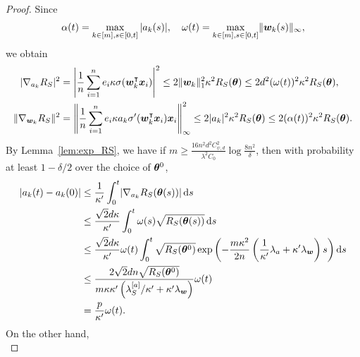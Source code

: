 \documentclass{article}
\begin{document}
\begin{proof}
    Since
    \begin{equation*}
        \alpha(t)=\max\limits_{k\in[m],s\in[0,t]}|a_k(s)|, \quad \omega(t)=\max\limits_{k\in[m],s\in[0,t]}\lVert\bm{w}_k(s)\rVert_{\infty},
    \end{equation*}
    we obtain
    \begin{equation*}
        \begin{aligned}
            \lvert\nabla_{a_k}R_S\rvert^2    & =\left\lvert\frac{1}{n}\sum_{i=1}^n e_i\kappa\sigma(\bm{w}_k^\intercal\bm{x}_i)\right\rvert^2\leq 2\lVert\bm{w}_k\rVert^2_1\kappa^2R_S(\bm{\theta})\leq 2d^2(\omega(t))^2\kappa^2R_S(\bm{\theta}),            \\
            \lVert\nabla_{\bm{w}_k}R_S\rVert^2 & =\left\lVert\frac{1}{n}\sum_{i=1}^n e_i\kappa a_k\sigma'(\bm{w}_k^\intercal\bm{x}_i)\bm{x}_i\right\rVert^2_{\infty}\leq 2\lvert a_k\rvert^2\kappa^2R_S(\bm{\theta})\leq 2(\alpha(t))^2\kappa^2R_S(\bm{\theta}).
        \end{aligned}
    \end{equation*}
    By Lemma~\ref{lem:exp_RS}, we have if $m\geq \frac{16n^2d^2C_{\psi,d}^2}{\lambda^2C_0}\log\frac{8n^2}{\delta}$, then with probability at least $1 - \delta/2$ over the choice of $\bm{\theta}^0$,
    \begin{equation*}
        \begin{aligned}
            \lvert a_k(t) - a_k(0)\rvert
             & \leq\frac{1}{\kappa'}\int_0^t\lvert\nabla_{a_k}R_S(\bm{\theta}(s))\rvert\mathop{}\!\mathrm{d}{s}                                                                                                                   \\
             & \leq\frac{\sqrt{2}d\kappa}{\kappa'}\int_{0}^{t} \omega(s)\sqrt{R_S(\bm{\theta}(s))}\mathop{}\!\mathrm{d}{s}                                                                                                  \\
             & \leq\frac{\sqrt{2}d\kappa}{\kappa'}\omega(t)\int_{0}^{t}\sqrt{R_S(\bm{\theta}^0)}\exp\left(-\frac{m\kappa^2}{2n}\left(\frac{1}{\kappa'}\lambda_a+\kappa'\lambda_{\bm{w}}\right)s\right)\mathop{}\!\mathrm{d}{s} \\
             & \leq \frac{2\sqrt{2}dn\sqrt{R_S(\bm{\theta}^0)}}{m\kappa\kappa'\left(\lambda^{[a]}_S/\kappa'+\kappa'\lambda_{\bm{w}}\right)}\omega(t)                                                           \\
             & =\frac{p}{\kappa'}\omega(t).
        \end{aligned}
    \end{equation*}
    On the other hand,
    \begin{equation*}

\end{equation*}
\end{proof}
\end{document}
